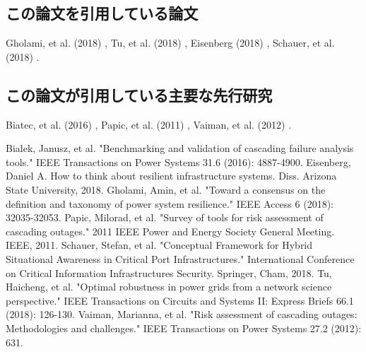 \documentclass[a4paper,11pt]{jsarticle}
\begin{document}
    \subsection{この論文を引用している論文}
    Gholami, et al. (2018) \cite{GholamiETAL2018},
    Tu, et al. (2018) \cite{TuETAL2018},
    Eisenberg (2018) \cite{Eisenberg2018},
    Schauer, et al. (2018) \cite{SchauerETAL2018}.
    \subsection{この論文が引用している主要な先行研究}
    Biatec, et al. (2016) \cite{BialekETAL2016},
    Papic, et al. (2011) \cite{PapicETAL2011},
    Vaiman, et al. (2012) \cite{VaimanETAL2012}.

\newpage

\begin{thebibliography}{99}
  Bialek, Janusz, et al. "Benchmarking and validation of cascading failure analysis tools." IEEE Transactions on Power Systems 31.6 (2016): 4887-4900.
  Eisenberg, Daniel A. How to think about resilient infrastructure systems. Diss. Arizona State University, 2018.
  Gholami, Amin, et al. "Toward a consensus on the definition and taxonomy of power system resilience." IEEE Access 6 (2018): 32035-32053.
  Papic, Milorad, et al. "Survey of tools for risk assessment of cascading outages." 2011 IEEE Power and Energy Society General Meeting. IEEE, 2011.
  Schauer, Stefan, et al. "Conceptual Framework for Hybrid Situational Awareness in Critical Port Infrastructures." International Conference on Critical Information Infrastructures Security. Springer, Cham, 2018.
  Tu, Haicheng, et al. "Optimal robustness in power grids from a network science perspective." IEEE Transactions on Circuits and Systems II: Express Briefs 66.1 (2018): 126-130.
  Vaiman, Marianna, et al. "Risk assessment of cascading outages: Methodologies and challenges." IEEE Transactions on Power Systems 27.2 (2012): 631.

\end{thebibliography}
\end{document}
